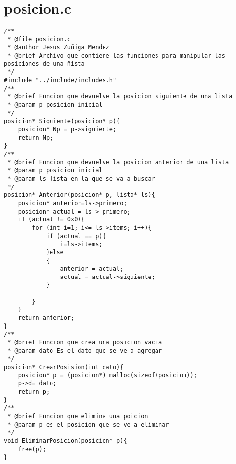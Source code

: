 \newpage
\section{posicion.c}

\begin{verbatim} 
/**
 * @file posicion.c
 * @author Jesus Zuñiga Mendez
 * @brief Archivo que contiene las funciones para manipular las posiciones de una ñista
 */
#include "../include/includes.h"
/**
 * @brief Funcion que devuelve la posicion siguiente de una lista
 * @param p posicion inicial
 */
posicion* Siguiente(posicion* p){
    posicion* Np = p->siguiente;
    return Np;
}
/**
 * @brief Funcion que devuelve la posicion anterior de una lista
 * @param p posicion inicial
 * @param ls lista en la que se va a buscar
 */
posicion* Anterior(posicion* p, lista* ls){
    posicion* anterior=ls->primero;
    posicion* actual = ls-> primero;
    if (actual != 0x0){
        for (int i=1; i<= ls->items; i++){
            if (actual == p){
                i=ls->items;
            }else
            {
                anterior = actual;
                actual = actual->siguiente;
            }

        }
    }
    return anterior;
}
/**
 * @brief Funcion que crea una posicion vacia
 * @param dato Es el dato que se ve a agregar
 */
posicion* CrearPosision(int dato){
    posicion* p = (posicion*) malloc(sizeof(posicion));
    p->d= dato;
    return p;
}
/**
 * @brief Funcion que elimina una poicion
 * @param p es el posicion que se ve a eliminar
 */
void EliminarPosicion(posicion* p){
    free(p);
}

\end{verbatim}

\newpage

